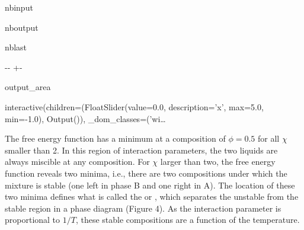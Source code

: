 \documentclass[letterpaper,10pt,english]{sphinxmanual}
\newlength\nbsphinxcodecellspacing
\begin{document}
\begin{sphinxuseclass}{nbinput}
{
\begin{sphinxVerbatim}[commandchars=\\\{\}]
\llap{\color{nbsphinxin}[8]:\,\hspace{\fboxrule}\hspace{\fboxsep}}
   
\end{sphinxVerbatim}
}

\end{sphinxuseclass}
\begin{sphinxuseclass}{nboutput}
\begin{sphinxuseclass}{nblast}
{

\kern-\sphinxverbatimsmallskipamount\kern-\baselineskip
\kern+\FrameHeightAdjust\kern-\fboxrule
\vspace{\nbsphinxcodecellspacing}

\begin{sphinxuseclass}{output_area}
\begin{sphinxuseclass}{}


\begin{sphinxVerbatim}[commandchars=\\\{\}]
interactive(children=(FloatSlider(value=0.0, description='x', max=5.0, min=-1.0), Output()), \_dom\_classes=('wi…
\end{sphinxVerbatim}



\end{sphinxuseclass}
\end{sphinxuseclass}
}

\end{sphinxuseclass}
\end{sphinxuseclass}
\sphinxAtStartPar
The free energy function has a minimum at a composition of \(\phi=0.5\) for all \(\chi\) smaller than 2. In this region of interaction parameters, the two liquids are always miscible at any composition. For \(\chi\) larger than two, the free energy function reveals two minima, i.e., there are two compositions under which the mixture is stable (one left in phase B and one right in A). The location of these two minima defines what is called the  or ,
which separates the unstable from the stable region in a phase diagram (Figure 4). As the interaction parameter is proportional to \(1/T\), these stable compositions are a function of the temperature.
\end{document}
